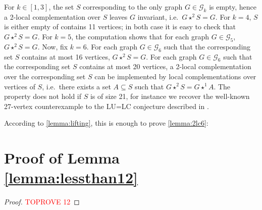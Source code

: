 \documentclass[a4paper,UKenglish,cleveref,autoref,thm-restate]{arxiv}
\newcommand{\se}{\subseteq}
\begin{document}
For $k \in [1,3]$, the set $S$ corresponding to the only graph $G \in \mathcal G_k$ is empty, hence a 2-local complementation over $S$ leaves $G$ invariant, i.e.~$G \star^2 S = G$. For $k = 4$, $S$ is either empty of contains 11 vertices; in both case it is easy to check that $G \star^2 S = G$. For $k = 5$, the computation shows that for each graph $G \in \mathcal G_5$, $G \star^2 S = G$. Now, fix $k=6$. For each graph $G \in \mathcal G_6$ such that the corresponding set $S$ contains at most 16 vertices, $G \star^2 S = G$. For each graph $G \in \mathcal G_6$ such that the corresponding set $S$ contains at most 20 vertices, a 2-local complementation over the corresponding set $S$ can be implemented by local complementations over vertices of $S$, i.e.~there exists a set $A \se S$ such that $G \star^2 S = G \star^1 A$. The property does not hold if $S$ is of size 21, for instance we recover the well-known 27-vertex counterexample to the LU=LC conjecture described in \cite{Tsimakuridze17}.

According to \cref{lemma:lifting}, this is enough to prove \cref{lemma:2lc6}:

\computerassisted*

\section{Proof of Lemma \ref{lemma:lessthan12}} \label{app:lessthan12}

\lessthantwelve*

\begin{proof}\textcolor{red}{TOPROVE 12}\end{proof}
\end{document}
